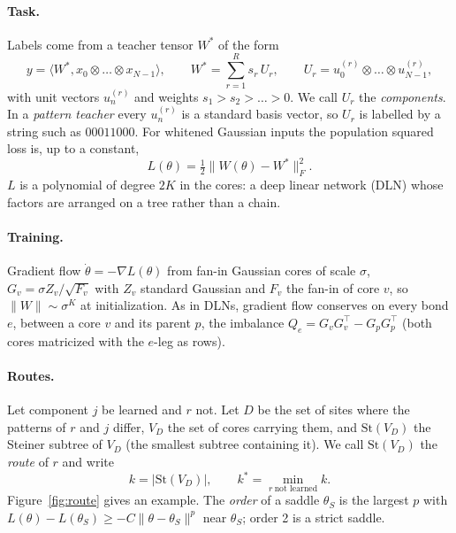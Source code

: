 \documentclass[11pt]{article}
\newcommand{\St}{\mathrm{St}}
\begin{document}
\paragraph{Task.} Labels come from a teacher tensor $W^*$ of the form
\begin{equation}
y=\langle W^*,x_0\otimes\dots\otimes x_{N-1}\rangle,\qquad
W^*=\sum_{r=1}^R s_r\,U_r,\qquad U_r=u^{(r)}_0\otimes\dots\otimes u^{(r)}_{N-1},
\end{equation}
with unit vectors $u^{(r)}_n$ and weights $s_1>s_2>\dots>0$. We call $U_r$ the \emph{components}. In a
\emph{pattern teacher} every $u^{(r)}_n$ is a standard basis vector, so $U_r$ is labelled by a string such as
$00011000$. For whitened Gaussian inputs the population squared loss is, up to a constant,
\begin{equation}
L(\theta)=\tfrac12\lVert W(\theta)-W^*\rVert_F^2 .
\end{equation}
$L$ is a polynomial of degree $2K$ in the cores: a deep linear network (DLN) whose factors are arranged on
a tree rather than a chain.

\paragraph{Training.} Gradient flow $\dot\theta=-\nabla L(\theta)$ from fan-in Gaussian cores of scale $\sigma$,
$G_v=\sigma Z_v/\sqrt{F_v}$ with $Z_v$ standard Gaussian and $F_v$ the fan-in of core $v$, so
$\lVert W\rVert\sim\sigma^K$ at initialization. As in DLNs, gradient flow conserves on every bond $e$, between a
core $v$ and its parent $p$, the imbalance $Q_e=G_vG_v^\top-G_pG_p^\top$ (both cores matricized with the
$e$-leg as rows).

\paragraph{Routes.} Let component $j$ be learned and $r$ not. Let $D$ be the set of sites where the patterns of
$r$ and $j$ differ, $V_D$ the set of cores carrying them, and $\St(V_D)$ the Steiner subtree of $V_D$ (the
smallest subtree containing it). We call $\St(V_D)$ the \emph{route} of $r$ and write
\begin{equation}
k=\lvert\St(V_D)\rvert,\qquad k^*=\min_{r\ \text{not learned}}k .
\end{equation}
Figure~\ref{fig:route} gives an example. The \emph{order} of a saddle $\theta_S$ is the largest $p$ with
$L(\theta)-L(\theta_S)\ge-C\lVert\theta-\theta_S\rVert^p$ near $\theta_S$; order 2 is a strict saddle.
\end{document}
